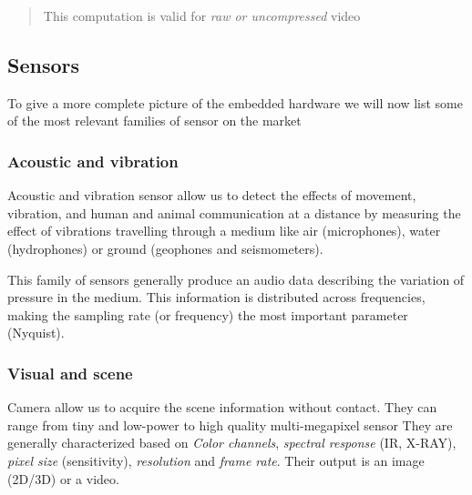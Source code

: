 \documentclass{article}
\begin{document}
        \begin{quote}
          This computation is valid for \emph{raw or uncompressed} video
        \end{quote}

    \subsection{Sensors}
        To give a more complete picture of the embedded hardware we will now list some of the most relevant families of sensor on the market

        \subsubsection{Acoustic and vibration}
          Acoustic and vibration sensor allow us to detect the effects of movement, vibration, and
          human and animal communication at a distance by measuring the effect of vibrations travelling through a
          medium like air (microphones), water (hydrophones) or ground (geophones and seismometers).

          This family of sensors generally produce an audio data describing the variation of pressure in the medium. This information is distributed across frequencies,
          making the sampling rate (or frequency) the most important parameter (Nyquist).
        
        \subsubsection{Visual and scene}
          Camera allow us to acquire the scene information without contact. They can range from tiny and low-power to high quality multi-megapixel sensor     
          They are generally characterized based on \emph{Color channels}, \emph{spectral response} (IR, X-RAY), \emph{pixel size} (sensitivity), \emph{resolution} and \emph{frame rate}.
          Their output is an image (2D/3D) or a video.
\end{document}
